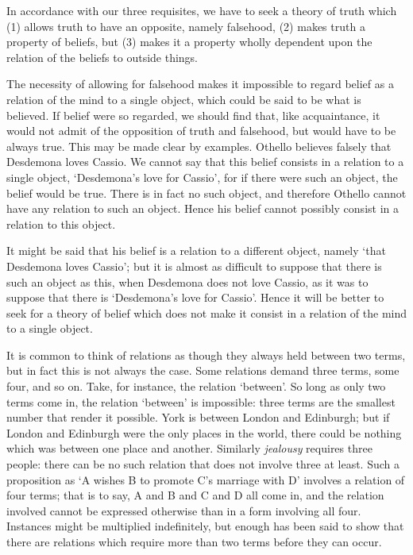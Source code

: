 \documentclass[oneside,letterpaper,12pt]{book}
\begin{document}
In accordance with our three requisites, we have to seek a theory of
truth which (1) allows truth to have an opposite, namely falsehood, (2)
makes truth a property of beliefs, but (3) makes it a property wholly
dependent upon the relation of the beliefs to outside things.

The necessity of allowing for falsehood makes it impossible to regard
belief as a relation of the mind to a single object, which could be said
to be what is believed. \label{entities} If belief were so regarded, we should find that,
like acquaintance, it would not admit of the opposition of truth and
falsehood, but would have to be always true. This may be made clear by
examples. Othello believes falsely that Desdemona loves Cassio. We
cannot say that this belief consists in a relation to a single object,
`Desdemona's love for
Cassio', for if there were such an object, the belief
would be true. There is in fact no such object, and therefore Othello
cannot have any relation to such an object. Hence his belief cannot
possibly consist in a relation to this object.

It might be said that his belief is a relation to a different object,
namely `that Desdemona loves Cassio'; but
it is almost as difficult to suppose that there is such an object as
this, when Desdemona does not love Cassio, as it was to suppose that
there is `Desdemona's love for
Cassio'. Hence it will be better to seek for a theory of
belief which does not make it consist in a relation of the mind to a
single object.

It is common to think of relations as though they always held between
two terms, but in fact this is not always the case. Some relations
demand three terms, some four, and so on. Take, for instance, the
relation `between'. So long as only two
terms come in, the relation `between'
is impossible: three terms are the smallest number that render it
possible. York is between London and Edinburgh; but if London and
Edinburgh were the only places in the world, there could be nothing
which was between one place and another. Similarly \emph{jealousy}
requires three people: there can be no such relation that does not
involve three at least. Such a proposition as `A wishes
B to promote C's marriage with D'
involves a relation of four terms; that is to say, A and B and C and D
all come in, and the relation involved cannot be expressed otherwise
than in a form involving all four. Instances might be multiplied
indefinitely, but enough has been said to show that there are relations
which require more than two terms before they can occur.
\end{document}
